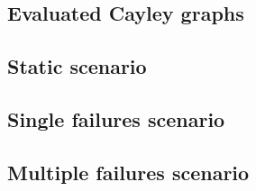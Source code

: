 \subsection{Evaluated Cayley graphs}

\subsection{Static scenario}

\subsection{Single failures scenario}





\subsection{Multiple failures scenario}



